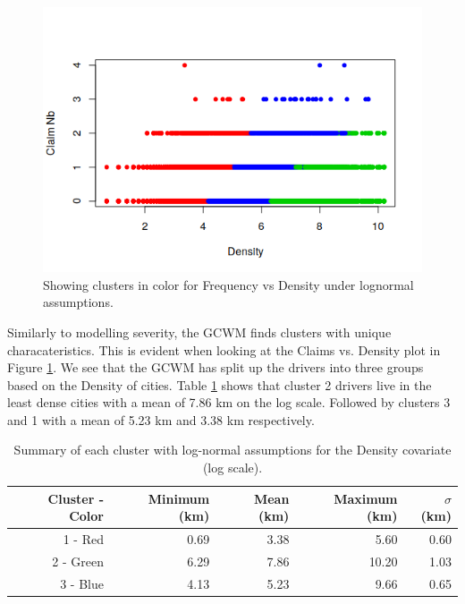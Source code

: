 \documentclass[11pt,letterpaper]{article}
\numberwithin{equation}{section}
\numberwithin{equation}{section}
\numberwithin{equation}{section}
\begin{document}
\begin{figure}[!ht]
\begin{center}
\caption{Showing clusters in color for Frequency vs Density under lognormal assumptions.}
\label{frequencyGraph}
\includegraphics[scale=0.80]{frequency.png}
\end{center}
\end{figure}

Similarly to modelling severity, the GCWM finds clusters with unique characateristics. This is evident when looking at the Claims vs. Density plot in Figure \ref{frequencyGraph}. We see that the GCWM has split up the drivers into three groups based on the Density of cities. Table \ref{summarycovariates} shows that cluster 2 drivers live in the least dense cities with a mean of 7.86 km on the log scale. Followed by clusters 3 and 1 with a mean of 5.23 km and 3.38 km respectively.

 \begin{table}[!htb]
 \begin{center}
 \caption{Summary of each cluster with log-normal assumptions for the Density covariate (log scale).} \label{summarycovariates}
\begin{tabular}{rrrrr}
\hline
\hline
Cluster - Color & Minimum (km) & Mean (km) & Maximum (km) & $\sigma$ (km) \\
\hline
1 - Red         & 0.69    & 3.38 & 5.60    & 0.60  \\
2 - Green       & 6.29    & 7.86 & 10.20   & 1.03  \\
3 - Blue        & 4.13    & 5.23 & 9.66    & 0.65 \\
\hline\hline
\end{tabular}
\end{center}
\end{table}
\end{document}
